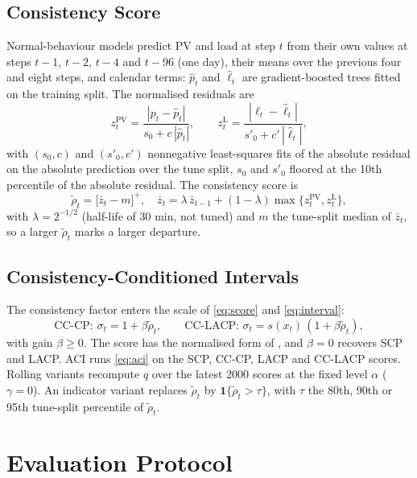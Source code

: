 \documentclass[conference,a4paper]{IEEEtran}
\begin{document}
\subsection{Consistency Score}
Normal-behaviour models predict PV and load at step $t$ from their own values at steps $t-1$, $t-2$, $t-4$ and
$t-96$ (one day), their means over the previous four and eight steps, and calendar terms: $\hat p_t$ and $\hat\ell_t$ are
gradient-boosted trees fitted on the training split. The normalised residuals are
\begin{equation}
z^{\mathrm{PV}}_t=\frac{|p_t-\hat p_t|}{s_0+c\,|\hat p_t|},\qquad
z^{\mathrm{L}}_t=\frac{|\ell_t-\hat\ell_t|}{s'_0+c'\,|\hat\ell_t|}, \label{eq:z}
\end{equation}
with $(s_0,c)$ and $(s'_0,c')$ nonnegative least-squares fits of the absolute residual on the absolute prediction
over the tune split, $s_0$ and $s'_0$ floored at the 10th percentile of the absolute residual. The consistency
score is
\begin{equation}
\tilde\rho_t=\big[\bar z_t-m\big]^+,\quad
\bar z_t=\lambda\,\bar z_{t-1}+(1-\lambda)\max\{z^{\mathrm{PV}}_t,z^{\mathrm{L}}_t\}, \label{eq:rho}
\end{equation}
with $\lambda=2^{-1/2}$ (half-life of 30 min, not tuned) and $m$ the tune-split median of $\bar z_t$, so a
larger $\tilde\rho_t$ marks a larger departure.

\subsection{Consistency-Conditioned Intervals}
The consistency factor enters the scale of \eqref{eq:score} and \eqref{eq:interval}:
\begin{equation}
\text{CC-CP: } \sigma_t=1+\beta\tilde\rho_t,\qquad \text{CC-LACP: } \sigma_t=s(x_t)\,(1+\beta\tilde\rho_t),
\label{eq:cc}
\end{equation}
with gain $\beta\ge0$. The score has the normalised form of \cite{papadopoulos11,chin}, and $\beta=0$ recovers SCP
and LACP. ACI runs \eqref{eq:aci} on the SCP, CC-CP, LACP and CC-LACP scores. Rolling variants recompute $q$ over the latest 2000 scores at the fixed level $\alpha$ ($\gamma=0$). An
indicator variant replaces $\tilde\rho_t$ by $\mathbf{1}\{\tilde\rho_t>\tau\}$, with $\tau$ the 80th, 90th or 95th
tune-split percentile of $\tilde\rho_t$.

\section{Evaluation Protocol}\label{sec:protocol}
\end{document}

